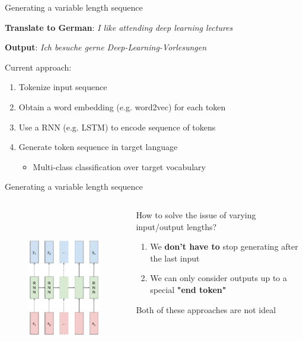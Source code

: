 \documentclass[12pt,aspectratio=169,handout]{beamer}
\begin{document}
\begin{frame}{Generating a variable length sequence}

	\textbf{Translate to German}: \textit{I like attending deep learning lectures}

	\pause

	\textbf{Output}: \textit{Ich besuche gerne Deep-Learning-Vorlesungen}

	\pause

	Current approach:
	\begin{enumerate}
		\item Tokenize input sequence
		\item Obtain a word embedding (e.g. word2vec) for each token
		\item Use a RNN (e.g. LSTM) to encode sequence of tokens
		\item Generate token sequence in target language
		\pause
		\begin{itemize}
			\item Multi-class classification over target vocabulary
		\end{itemize}
	\end{enumerate}

\end{frame}


\begin{frame}{Generating a variable length sequence}
\begin{columns}[T] %
		\begin{column}{.48\textwidth}
			\begin{figure}[h]
				\includegraphics[height=7cm]{variable_input_output.pdf}
			\end{figure}
		\end{column}

		\begin{column}{.48\textwidth}
			\pause
			\vspace{1cm}
			How to solve the issue of varying input/output lengths?
			\pause
	
			\begin{enumerate}
				\item We \textbf{don't have to} stop generating after the last input
				\item We can only consider outputs up to a special \textbf{"end token"} 
			\end{enumerate}
			\pause
			Both of these approaches are not ideal
		\end{column}
\end{columns}
\end{frame}
\end{document}
